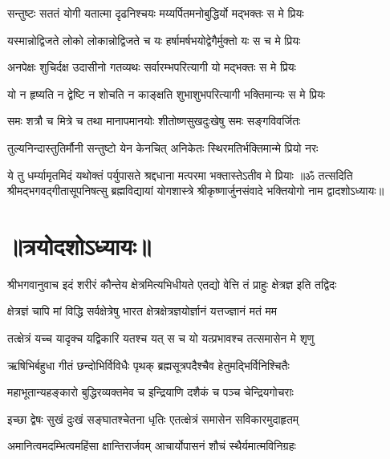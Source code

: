 \twolineshloka
{सन्तुष्टः सततं योगी यतात्मा दृढनिश्चयः}
{मय्यर्पितमनोबुद्धिर्यो मद्भक्तः स मे प्रियः}%

\twolineshloka
{यस्मान्नोद्विजते लोको लोकान्नोद्विजते च यः}
{हर्षामर्षभयोद्वेगैर्मुक्तो यः स च मे प्रियः}%

\twolineshloka
{अनपेक्षः शुचिर्दक्ष उदासीनो गतव्यथः}
{सर्वारम्भपरित्यागी यो मद्भक्तः स मे प्रियः}%

\twolineshloka
{यो न हृष्यति न द्वेष्टि न शोचति न काङ्क्षति}
{शुभाशुभपरित्यागी भक्तिमान्यः स मे प्रियः}%

\twolineshloka
{समः शत्रौ च मित्रे च तथा मानापमानयोः}
{शीतोष्णसुखदुःखेषु समः सङ्गविवर्जितः}%

\twolineshloka
{तुल्यनिन्दास्तुतिर्मौनी सन्तुष्टो येन केनचित्}
{अनिकेतः स्थिरमतिर्भक्तिमान्मे प्रियो नरः}%

\twolineshloka
{ये तु धर्म्यामृतमिदं यथोक्तं पर्युपासते}
{श्रद्दधाना मत्परमा भक्तास्तेऽतीव मे प्रियाः}%
{॥ॐ तत्सदिति श्रीमद्भगवद्गीतासूपनिषत्सु ब्रह्मविद्यायां योगशास्त्रे श्रीकृष्णार्जुनसंवादे भक्तियोगो नाम द्वादशोऽध्यायः॥}

\section{॥त्रयोदशोऽध्यायः॥}

{श्रीभगवानुवाच}
\twolineshloka
{इदं शरीरं कौन्तेय क्षेत्रमित्यभिधीयते}
{एतद्यो वेत्ति तं प्राहुः क्षेत्रज्ञ इति तद्विदः}%

\twolineshloka
{क्षेत्रज्ञं चापि मां विद्धि सर्वक्षेत्रेषु भारत}
{क्षेत्रक्षेत्रज्ञयोर्ज्ञानं यत्तज्ज्ञानं मतं मम}%

\twolineshloka
{तत्क्षेत्रं यच्च यादृक्च यद्विकारि यतश्च यत्}
{स च यो यत्प्रभावश्च तत्समासेन मे शृणु}%

\twolineshloka
{ऋषिभिर्बहुधा गीतं छन्दोभिर्विविधैः पृथक्}
{ब्रह्मसूत्रपदैश्चैव हेतुमद्भिर्विनिश्चितैः}%

\twolineshloka
{महाभूतान्यहङ्कारो बुद्धिरव्यक्तमेव च}
{इन्द्रियाणि दशैकं च पञ्च चेन्द्रियगोचराः}%

\twolineshloka
{इच्छा द्वेषः सुखं दुःखं सङ्घातश्चेतना धृतिः}
{एतत्क्षेत्रं समासेन सविकारमुदाहृतम्}%

\twolineshloka
{अमानित्वमदम्भित्वमहिंसा क्षान्तिरार्जवम्}
{आचार्योपासनं शौचं स्थैर्यमात्मविनिग्रहः}%


